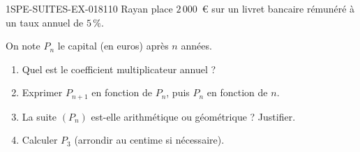 \begin{exercice}{1SPE-SUITES-EX-018}{1}{10}
Rayan place $2\,000$~€ sur un livret bancaire rémunéré à un taux annuel de $5\,\%$.

On note $P_n$ le capital (en euros) après $n$ années.
\begin{enumerate}
  \item Quel est le coefficient multiplicateur annuel ?
  \item Exprimer $P_{n+1}$ en fonction de $P_n$, puis $P_n$ en fonction de $n$.
  \item La suite $(P_n)$ est-elle arithmétique ou géométrique ? Justifier.
  \item Calculer $P_3$ (arrondir au centime si nécessaire).
\end{enumerate}
\end{exercice}
